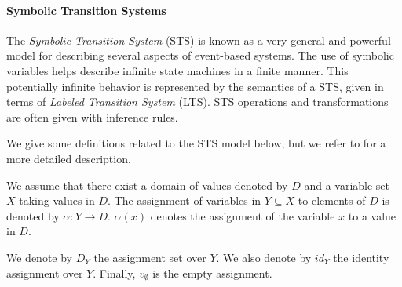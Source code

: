 \paragraph{Symbolic Transition Systems}
\label{sec:definitions:sts}

The \textit{Symbolic Transition System} (STS) is known as a very
general and powerful model for describing several aspects of
event-based systems. The use of symbolic variables
helps describe infinite state machines in a finite manner. This
potentially infinite behavior is represented by the semantics of
a STS, given in terms of \textit{Labeled Transition System}
(LTS). STS operations and transformations are often given with
inference rules.

We give some definitions related to the STS model below, but we
refer to \cite{FTW05} for a more detailed description.

\begin{definition}
We assume that there exist a domain of values denoted by $D$ and
a variable set $X$ taking values in $D$. The assignment of
variables in $Y \subseteq X$ to elements of $D$ is denoted by
$\alpha: Y \rightarrow D$. $\alpha(x)$ denotes the assignment of
the variable $x$ to a value in $D$.

We denote by $D_Y$ the assignment set over $Y$. We also denote by
$id_Y$ the identity assignment over $Y$. Finally, $v_\emptyset$
is the empty assignment.
\end{definition}

